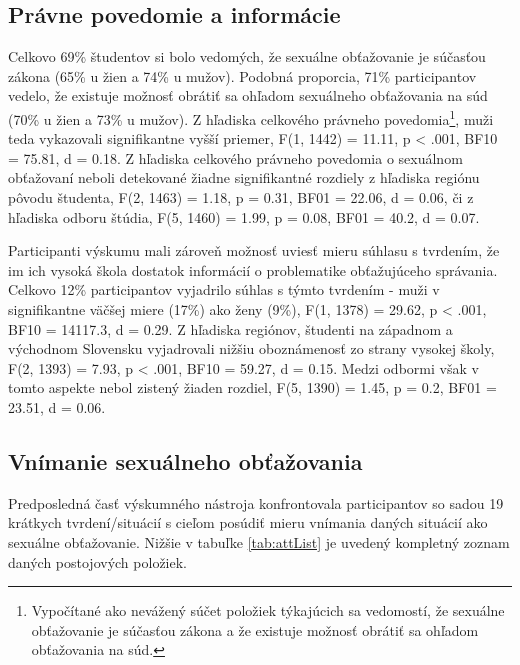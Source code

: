 \documentclass[
]{article}
\begin{document}
\hypertarget{pruxe1vne-povedomie-a-informuxe1cie}{%
\subsection{Právne povedomie a informácie}\label{pruxe1vne-povedomie-a-informuxe1cie}}

Celkovo 69\% študentov si bolo vedomých, že sexuálne obťažovanie je súčasťou zákona (65\% u žien a 74\% u mužov). Podobná proporcia, 71\% participantov vedelo, že existuje možnosť obrátiť sa ohľadom sexuálneho obťažovania na súd (70\% u žien a 73\% u mužov). Z hľadiska celkového právneho povedomia\footnote{Vypočítané ako nevážený súčet položiek týkajúcich sa vedomostí, že sexuálne obťažovanie je súčasťou zákona a že existuje možnosť obrátiť sa ohľadom obťažovania na súd.}, muži teda vykazovali signifikantne vyšší priemer, F(1, 1442) = 11.11, p \textless{} .001, BF10 = 75.81, d = 0.18. Z hľadiska celkového právneho povedomia o sexuálnom obťažovaní neboli detekované žiadne signifikantné rozdiely z hľadiska regiónu pôvodu študenta, F(2, 1463) = 1.18, p = 0.31, BF01 = 22.06, d = 0.06, či z hľadiska odboru štúdia, F(5, 1460) = 1.99, p = 0.08, BF01 = 40.2, d = 0.07.

Participanti výskumu mali zároveň možnosť uviesť mieru súhlasu s tvrdením, že im ich vysoká škola dostatok informácií o problematike obťažujúceho správania. Celkovo 12\% participantov vyjadrilo súhlas s týmto tvrdením - muži v signifikantne väčšej miere (17\%) ako ženy (9\%), F(1, 1378) = 29.62, p \textless{} .001, BF10 = 14117.3, d = 0.29. Z hľadiska regiónov, študenti na západnom a východnom Slovensku vyjadrovali nižšiu oboznámenosť zo strany vysokej školy, F(2, 1393) = 7.93, p \textless{} .001, BF10 = 59.27, d = 0.15. Medzi odbormi však v tomto aspekte nebol zistený žiaden rozdiel, F(5, 1390) = 1.45, p = 0.2, BF01 = 23.51, d = 0.06.

\hypertarget{vnuxedmanie-sexuuxe1lneho-obux165aux17eovania}{%
\subsection{Vnímanie sexuálneho obťažovania}\label{vnuxedmanie-sexuuxe1lneho-obux165aux17eovania}}

Predposledná časť výskumného nástroja konfrontovala participantov so sadou 19 krátkych tvrdení/situácií s cieľom posúdiť mieru vnímania daných situácií ako sexuálne obťažovanie. Nižšie v tabuľke \ref{tab:attList} je uvedený kompletný zoznam daných postojových položiek.
\end{document}
